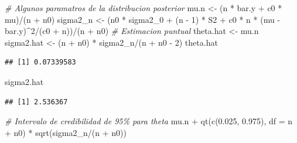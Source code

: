 \documentclass[
  10pt,
  spanish,
]{book}
\newenvironment{Shaded}{\begin{snugshade}}{\end{snugshade}}
\newcommand{\AttributeTok}[1]{\textcolor[rgb]{0.77,0.63,0.00}{#1}}
\newcommand{\CommentTok}[1]{\textcolor[rgb]{0.56,0.35,0.01}{\textit{#1}}}
\newcommand{\DecValTok}[1]{\textcolor[rgb]{0.00,0.00,0.81}{#1}}
\newcommand{\FloatTok}[1]{\textcolor[rgb]{0.00,0.00,0.81}{#1}}
\newcommand{\FunctionTok}[1]{\textcolor[rgb]{0.00,0.00,0.00}{#1}}
\newcommand{\NormalTok}[1]{#1}
\newcommand{\OtherTok}[1]{\textcolor[rgb]{0.56,0.35,0.01}{#1}}
\newcommand{\SpecialCharTok}[1]{\textcolor[rgb]{0.00,0.00,0.00}{#1}}
\theoremstyle{definition}
\theoremstyle{definition}
\theoremstyle{definition}
\theoremstyle{definition}
\theoremstyle{remark}
\begin{document}
\begin{Shaded}
\begin{Highlighting}[]
\CommentTok{\# Algunos paramatros de la distribucion posterior}
\NormalTok{mu.n }\OtherTok{\textless{}{-}}\NormalTok{ (n }\SpecialCharTok{*}\NormalTok{ bar.y }\SpecialCharTok{+}\NormalTok{ c0 }\SpecialCharTok{*}\NormalTok{ mu)}\SpecialCharTok{/}\NormalTok{(n }\SpecialCharTok{+}\NormalTok{ n0)}
\NormalTok{sigma2\_n }\OtherTok{\textless{}{-}}\NormalTok{ (n0 }\SpecialCharTok{*}\NormalTok{ sigma2\_0 }\SpecialCharTok{+}\NormalTok{ (n }\SpecialCharTok{{-}} \DecValTok{1}\NormalTok{) }\SpecialCharTok{*}\NormalTok{ S2 }\SpecialCharTok{+}
\NormalTok{               c0 }\SpecialCharTok{*}\NormalTok{ n }\SpecialCharTok{*}\NormalTok{ (mu }\SpecialCharTok{{-}}\NormalTok{ bar.y)}\SpecialCharTok{\^{}}\DecValTok{2}\SpecialCharTok{/}\NormalTok{(c0 }\SpecialCharTok{+}\NormalTok{ n))}\SpecialCharTok{/}\NormalTok{(n }\SpecialCharTok{+}\NormalTok{ n0)}
\CommentTok{\# Estimacion puntual}
\NormalTok{theta.hat }\OtherTok{\textless{}{-}}\NormalTok{ mu.n }
\NormalTok{sigma2.hat }\OtherTok{\textless{}{-}}\NormalTok{ (n }\SpecialCharTok{+}\NormalTok{ n0) }\SpecialCharTok{*}\NormalTok{ sigma2\_n}\SpecialCharTok{/}\NormalTok{(n }\SpecialCharTok{+}\NormalTok{ n0 }\SpecialCharTok{{-}} \DecValTok{2}\NormalTok{)}
\NormalTok{theta.hat}
\end{Highlighting}
\end{Shaded}

\begin{verbatim}
## [1] 0.07339583
\end{verbatim}

\begin{Shaded}
\begin{Highlighting}[]
\NormalTok{sigma2.hat}
\end{Highlighting}
\end{Shaded}

\begin{verbatim}
## [1] 2.536367
\end{verbatim}

\begin{Shaded}
\begin{Highlighting}[]
\CommentTok{\# Intervalo de credibilidad de 95\% para theta}
\NormalTok{mu.n }\SpecialCharTok{+} \FunctionTok{qt}\NormalTok{(}\FunctionTok{c}\NormalTok{(}\FloatTok{0.025}\NormalTok{, }\FloatTok{0.975}\NormalTok{), }\AttributeTok{df =}\NormalTok{ n }\SpecialCharTok{+}\NormalTok{ n0) }\SpecialCharTok{*} 
  \FunctionTok{sqrt}\NormalTok{(sigma2\_n}\SpecialCharTok{/}\NormalTok{(n }\SpecialCharTok{+}\NormalTok{ n0))}
\end{Highlighting}
\end{Shaded}
\end{document}
